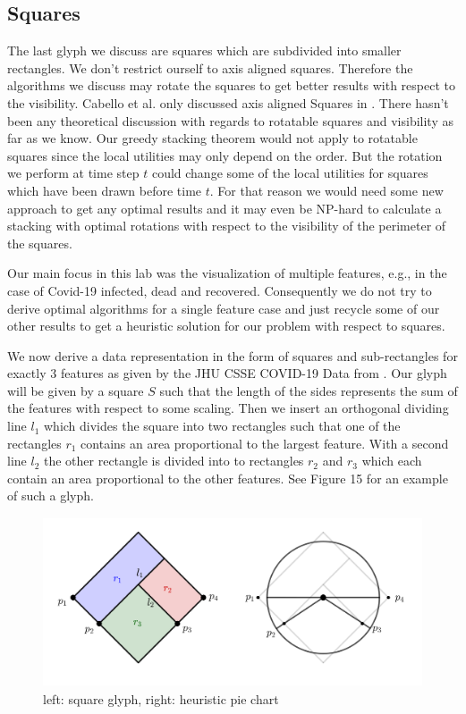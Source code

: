 \documentclass[a4paper,11pt]{article}
\begin{document}
\subsection{Squares}
The last glyph we discuss are squares which are subdivided into smaller rectangles. We don't restrict ourself to axis aligned squares. Therefore the algorithms we discuss may rotate the squares to get better results with respect to the visibility.
Cabello et al. only discussed axis aligned Squares in \cite{cabello}. There hasn't been any theoretical discussion with regards to rotatable squares and visibility as far as we know. Our greedy stacking theorem would not apply to rotatable squares since the local utilities may only depend on the order. But the rotation we perform at time step $t$ could change some of the local utilities for squares which have been drawn before time $t$. %
For that reason we would need some new approach to get any optimal results and it may even be NP-hard to calculate a stacking with optimal rotations with respect to the visibility of the perimeter of the squares.

Our main focus in this lab was the visualization of multiple features, e.g., in the case of Covid-19 infected, dead and recovered. Consequently we do not try to derive optimal algorithms for a single feature case and just recycle some of our other results to get a heuristic solution for our problem with respect to squares.



We now derive a data representation in the form of squares and sub-rectangles for exactly $3$ features as given by the JHU CSSE COVID-19 Data from \cite{data}. Our glyph will be given by a square $S$ such that the length of the sides represents the sum of the features with respect to some scaling. Then we insert an orthogonal dividing line $l_1$ which divides the square into two rectangles such that one of the rectangles $r_1$ contains an area proportional to the largest feature. With a second line $l_2$ the other rectangle is divided into to rectangles $r_2$ and $r_3$ which each contain an area proportional to the other features. See Figure 15 for an example of such a glyph.
\begin{figure}[t]
  \centering
  \includegraphics[height=5cm]{assets/square_glyphs}
  \caption{left: square glyph, right: heuristic pie chart}
\end{figure}
\end{document}
